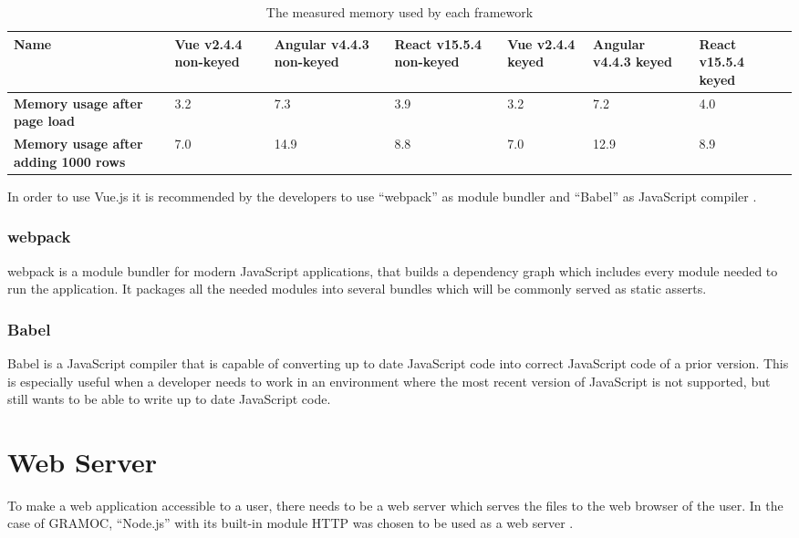 \begin{table}[H]
    \centering
    \begin{tabular}{| C{2.2cm} | C{1.5cm} | C{1.5cm} | C{1.5cm} | C{1.5cm} | C{1.5cm} | C{1.5cm} |}
    \hline
    \textbf{Name} & \textbf{Vue v2.4.4 non-keyed} & \textbf{Angular v4.4.3 non-keyed} & \textbf{React v15.5.4 non-keyed} & \textbf{Vue v2.4.4 keyed} & \textbf{Angular v4.4.3 keyed} & \textbf{React v15.5.4 keyed} \\ \hline
    \textbf{Memory usage after page load} & 3.2 & 7.3 & 3.9 & 3.2 & 7.2 & 4.0 \\ \hline
    \textbf{Memory usage after adding 1000 rows} & 7.0 & 14.9 & 8.8 & 7.0 & 12.9 & 8.9 \\
    \hline
    \end{tabular}
    \caption{The measured memory used by each framework}
    \label{tab:framework_perf_mem}
\end{table}

In order to use Vue.js it is recommended by the developers to use ``webpack''  as module bundler and ``Babel'' as JavaScript compiler \cite{webpack} \cite{Babel}.

\subsubsection{webpack}
webpack is a module bundler for modern JavaScript applications, that builds a dependency graph which includes every module needed to run the application. It packages all the needed modules into several bundles which will be commonly served as static asserts.

\subsubsection{Babel}
Babel is a JavaScript compiler that is capable of converting up to date JavaScript code into correct JavaScript code of a prior version. This is especially useful when a developer needs to work in an environment where the most recent version of JavaScript is not supported, but still wants to be able to write up to date JavaScript code.

\section{Web Server}
To make a web application accessible to a user, there needs to be a web server which serves the files to the web browser of the user. In the case of GRAMOC, ``Node.js'' with its built-in module HTTP was chosen to be used as a web server \cite{Node}.

